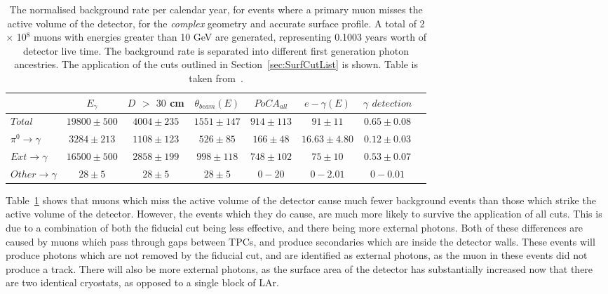 \begin{table}
  \caption[The normalised background rate per calendar year, for events where a primary muon misses the active volume of the detector, for the \emph{complex} geometry and accurate surface profile]
          {The normalised background rate per calendar year, for events where a primary muon misses the active volume of the detector, for the \emph{complex} geometry and accurate surface profile. A total of 2 $\times$ 10$^8$ muons with energies greater than 10 GeV are generated, representing 0.1003 years worth of detector live time. The background rate is separated into different first generation photon ancestries. The application of the cuts outlined in Section~\ref{sec:SurfCutList} is shown. Table is taken from~\citep{MartinsThesis}.}
  \label{tab:SurfMuMissComp}
  \centering
  \scriptsize
  \begin{tabular}{l c c c c c c c }
    \toprule
        & $E_\gamma$ &  $D$ $>$ $30$ cm & $\theta_{beam}(E)$ & $PoCA_{all}$ & $e-\gamma(E)$ & $\gamma$ $detection$ \\
        \midrule
        $Total$          & $19800\pm500$ & $4004\pm235$ & $1551\pm147$ & $914\pm113$ & $91\pm11$      & $0.65\pm0.08$ \\

        $\pi^0\to\gamma$ & $3284\pm213$  & $1108\pm123$ & $526\pm85$   & $166\pm48$  & $16.63\pm4.80$ & $0.12\pm0.03$ \\

        $Ext\to\gamma$   & $16500\pm500$ & $2858\pm199$ & $998\pm118$  & $748\pm102$ & $75\pm10$      & $0.53\pm0.07$ \\

        $Other\to\gamma$ & $28\pm5$      & $28\pm5$     & $28\pm5$     & $0-20$      & $0-2.01$       & $0-0.01$ \\
        \bottomrule
  \end{tabular}
\end{table}

Table~\ref{tab:SurfMuMissComp} shows that muons which miss the active volume of the detector cause much fewer background events than those which strike the active volume of the detector. However, the events which they do cause, are much more likely to survive the application of all cuts. This is due to a combination of both the fiducial cut being less effective, and there being more external photons. Both of these differences are caused by muons which pass through gaps between TPCs, and produce secondaries which are inside the detector walls. These events will produce photons which are not removed by the fiducial cut, and are identified as external photons, as the muon in these events did not produce a track. There will also be more external photons, as the surface area of the detector has substantially increased now that there are two identical cryostats, as opposed to a single block of LAr. \\

